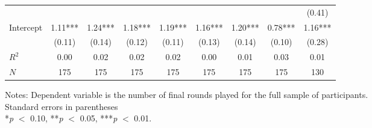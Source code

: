 \begin{table}[htbp]
\begin{threeparttable}
\begin{tabular}{l cccccccc}
                    &               &               &               &               &               &               &               &      (0.41)   \\
Intercept           &        1.11***&        1.24***&        1.18***&        1.19***&        1.16***&        1.20***&        0.78***&        1.16***\\
                    &      (0.11)   &      (0.14)   &      (0.12)   &      (0.11)   &      (0.13)   &      (0.14)   &      (0.10)   &      (0.28)   \\
\hline
$R^2$               &        0.00   &        0.02   &        0.02   &        0.02   &        0.00   &        0.01   &        0.03   &        0.01   \\
$N$                 &         175   &         175   &         175   &         175   &         175   &         175   &         175   &         130   \\
\hline
\hline
\end{tabular}
\begin{tablenotes}
\footnotesize
\item{Notes: Dependent variable is the number of final rounds played for the full sample of participants. \\ Standard errors in parentheses \\ *\textit{p} $<$ 0.10, **\textit{p} $<$ 0.05, ***\textit{p} $<$ 0.01.}
\end{tablenotes}
\end{threeparttable}
\end{table}
